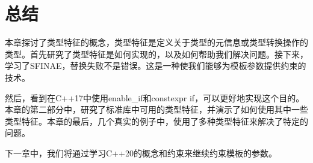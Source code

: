 \section{总结}
本章探讨了类型特征的概念，类型特征是定义关于类型的元信息或类型转换操作的类型。首先研究了类型特征是如何实现的，以及如何帮助我们解决问题。接下来，学习了SFINAE，替换失败不是错误。这是一种使我们能够为模板参数提供约束的技术。

然后，看到在C++17中使用enable\_if和constexpr if，可以更好地实现这个目的。本章的第二部分中，研究了标准库中可用的类型特征，并演示了如何使用其中一些类型特征。本章的最后，几个真实的例子中，使用了多种类型特征来解决了特定的问题。

下一章中，我们将通过学习C++20的概念和约束来继续约束模板的参数。